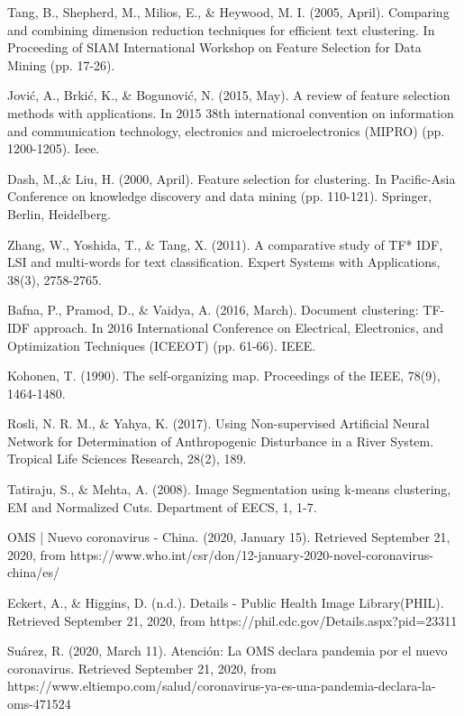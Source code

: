 \documentclass[10pt, a4paper]{article}
\begin{document}
\begin{thebibliography}{X}
 Tang, B., Shepherd, M., Milios, E., \& Heywood, M. I. (2005, April). Comparing and combining dimension reduction techniques for efficient text clustering. In Proceeding of SIAM International Workshop on Feature Selection for Data Mining (pp. 17-26).

 Jović, A., Brkić, K., \& Bogunović, N. (2015, May). A review of feature selection methods with applications. In 2015 38th international convention on information and communication technology, electronics and microelectronics (MIPRO) (pp. 1200-1205). Ieee.

 Dash, M.,\& Liu, H. (2000, April). Feature selection for clustering. In Pacific-Asia Conference on knowledge discovery and data mining (pp. 110-121). Springer, Berlin, Heidelberg.

 Zhang, W., Yoshida, T., \& Tang, X. (2011). A comparative study of TF* IDF, LSI and multi-words for text classification. Expert Systems with Applications, 38(3), 2758-2765.

 Bafna, P., Pramod, D.,  \& Vaidya, A. (2016, March). Document clustering: TF-IDF approach. In 2016 International Conference on Electrical, Electronics, and Optimization Techniques (ICEEOT) (pp. 61-66). IEEE.

 Kohonen, T. (1990). The self-organizing map. Proceedings of the IEEE, 78(9), 1464-1480.

 Rosli, N. R. M., \& Yahya, K. (2017). Using Non-supervised Artificial Neural Network for Determination of Anthropogenic Disturbance in a River System. Tropical Life Sciences Research, 28(2), 189.

 Tatiraju, S., \& Mehta, A. (2008). Image Segmentation using k-means clustering, EM and Normalized Cuts. Department of EECS, 1, 1-7.

 OMS | Nuevo coronavirus - China. (2020, January 15). Retrieved September 21, 2020, from https://www.who.int/csr/don/12-january-2020-novel-coronavirus-china/es/

 Eckert, A., \& Higgins, D. (n.d.). Details - Public Health Image Library(PHIL). Retrieved September 21, 2020, from https://phil.cdc.gov/Details.aspx?pid=23311

 Suárez, R. (2020, March 11). Atención: La OMS declara pandemia por el nuevo coronavirus. Retrieved September 21, 2020, from https://www.eltiempo.com/salud/coronavirus-ya-es-una-pandemia-declara-la-oms-471524
 

\end{thebibliography}
\end{document}
